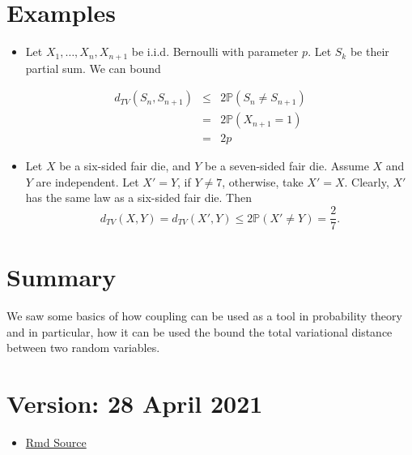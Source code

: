 \documentclass[
]{article}
\providecommand{\tightlist}{%
  \setlength{\itemsep}{0pt}\setlength{\parskip}{0pt}}
\theoremstyle{definition}
\theoremstyle{definition}
\theoremstyle{definition}
\theoremstyle{remark}
\begin{document}
\hypertarget{examples-1}{%
\section{Examples}\label{examples-1}}

\begin{itemize}
\tightlist
\item
  Let \(X_1, \ldots, X_n, X_{n+1}\) be i.i.d. Bernoulli with parameter \(p\). Let \(S_k\) be their partial sum. We can bound
\end{itemize}

\begin{eqnarray*}
d_{TV}(S_n, S_{n+1}) &\leq& 2\mathbb{P}(S_n \not = S_{n+1}) \\
&=&  2\mathbb{P}(X_{n+1} = 1) \\
&=&  2p
\end{eqnarray*}

\begin{itemize}
\tightlist
\item
  Let \(X\) be a six-sided fair die, and \(Y\) be a seven-sided fair die. Assume \(X\) and \(Y\) are independent. Let \(X' = Y\), if \(Y \not = 7\), otherwise, take \(X' = X\). Clearly, \(X'\) has the same law as a six-sided fair die. Then
  \[d_{TV}(X, Y)  = d_{TV}(X', Y) \leq 2\mathbb{P}(X' \not= Y )= \frac{2}{7}.\]
\end{itemize}

\hypertarget{summary}{%
\section{Summary}\label{summary}}

We saw some basics of how coupling can be used as a tool in probability theory and in particular, how it can be used the bound the total variational distance between two random variables.

\hypertarget{version-28-april-2021}{%
\section{Version: 28 April 2021}\label{version-28-april-2021}}

\begin{itemize}
\tightlist
\item
  \href{https://tsoo-math.github.io/ucl/TV-lec.Rmd}{Rmd Source}
\end{itemize}
\end{document}
